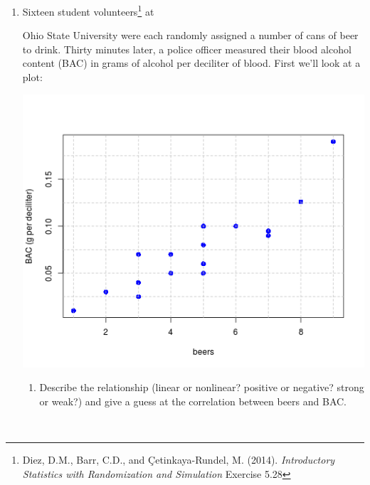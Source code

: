 \begin{enumerate}
\begin{enumerate}
\end{enumerate}


\item Sixteen student volunteers\footnote{ Diez, D.M., Barr, C.D., and
    \c{C}etinkaya-Rundel, M. (2014). {\it Introductory Statistics with
    Randomization and Simulation}
     Exercise 5.28}  at \vspace{-.2in}\\ 
  \begin{minipage}{.35\linewidth}
   Ohio State University were each
  randomly assigned a number of cans of beer to drink.  Thirty minutes
  later, a police officer measured their blood alcohol 
  content (BAC) in grams of alcohol per deciliter of blood. 
  First we'll look at a plot: \vspace*{1in}

  \end{minipage}\hfill
  \begin{minipage}{.60\linewidth}
    \includegraphics[width = \linewidth]{./plots/beer-BAC.png}
  \end{minipage}
\begin{enumerate}
  \item  Describe the relationship (linear or nonlinear? positive or
    negative? strong or weak?) and give a guess at the correlation
    between beers and BAC. 
\begin{students}
 \vspace{2cm}\\
\end{students}


\end{enumerate}
\end{enumerate}
